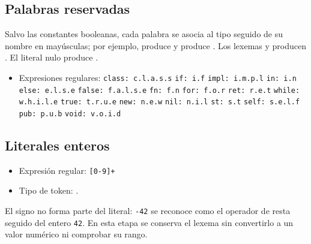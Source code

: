 \subsection{Palabras reservadas}
Salvo las constantes booleanas, cada palabra se asocia al tipo
 seguido de su nombre en mayúsculas; por ejemplo,
 produce  y  produce
. Los lexemas  y  producen
. El literal nulo  produce
.
\begin{itemize}[leftmargin=*]
  \item Expresiones regulares:
  \subitem \verb~class: c.l.a.s.s~
  \subitem \verb~if: i.f~
  \subitem \verb~impl: i.m.p.l~
  \subitem \verb~in: i.n~
  \subitem \verb~else: e.l.s.e~
  \subitem \verb~false: f.a.l.s.e~
  \subitem \verb~fn: f.n~
  \subitem \verb~for: f.o.r~
  \subitem \verb~ret: r.e.t~
  \subitem \verb~while: w.h.i.l.e~
  \subitem \verb~true: t.r.u.e~
  \subitem \verb~new: n.e.w~
  \subitem \verb~nil: n.i.l~
  \subitem \verb~st: s.t~
  \subitem \verb~self: s.e.l.f~
  \subitem \verb~pub: p.u.b~
  \subitem \verb~void: v.o.i.d~
\end{itemize}


\subsection{Literales enteros}
\begin{itemize}[leftmargin=*]
  \item Expresión regular: \verb~[0-9]+~
  \item Tipo de token: .
\end{itemize}
El signo no forma parte del literal: \verb~-42~ se reconoce como el operador
de resta seguido del entero \verb~42~. En esta etapa se conserva el lexema
sin convertirlo a un valor numérico ni comprobar su rango.


